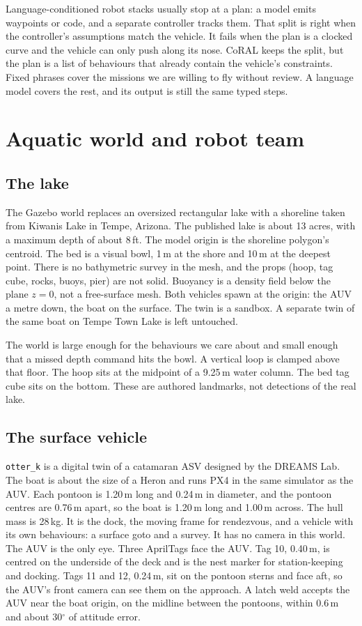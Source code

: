 \documentclass[conference]{IEEEtran}
\def\CoRAL{CoRAL}
\def\otterk{\texttt{otter\_k}}
\begin{document}
Language-conditioned robot stacks usually stop at a plan: a model emits waypoints or code, and a separate controller tracks them. That split is right when the controller's assumptions match the vehicle. It fails when the plan is a clocked curve and the vehicle can only push along its nose. \CoRAL{} keeps the split, but the plan is a list of behaviours that already contain the vehicle's constraints. Fixed phrases cover the missions we are willing to fly without review. A language model covers the rest, and its output is still the same typed steps.

\section{Aquatic world and robot team}
\label{sec:world}

\subsection{The lake}
The Gazebo world replaces an oversized rectangular lake with a shoreline taken from Kiwanis Lake in Tempe, Arizona. The published lake is about 13 acres, with a maximum depth of about 8\,ft. The model origin is the shoreline polygon's centroid. The bed is a visual bowl, 1\,m at the shore and 10\,m at the deepest point. There is no bathymetric survey in the mesh, and the props (hoop, tag cube, rocks, buoys, pier) are not solid. Buoyancy is a density field below the plane $z=0$, not a free-surface mesh. Both vehicles spawn at the origin: the AUV a metre down, the boat on the surface. The twin is a sandbox. A separate twin of the same boat on Tempe Town Lake is left untouched.

The world is large enough for the behaviours we care about and small enough that a missed depth command hits the bowl. A vertical loop is clamped above that floor. The hoop sits at the midpoint of a 9.25\,m water column. The bed tag cube sits on the bottom. These are authored landmarks, not detections of the real lake.

\subsection{The surface vehicle}
\otterk{} is a digital twin of a catamaran ASV designed by the DREAMS Lab. The boat is about the size of a Heron and runs PX4 in the same simulator as the AUV. Each pontoon is 1.20\,m long and 0.24\,m in diameter, and the pontoon centres are 0.76\,m apart, so the boat is 1.20\,m long and 1.00\,m across. The hull mass is 28\,kg. It is the dock, the moving frame for rendezvous, and a vehicle with its own behaviours: a surface goto and a survey. It has no camera in this world. The AUV is the only eye. Three AprilTags face the AUV. Tag 10, 0.40\,m, is centred on the underside of the deck and is the nest marker for station-keeping and docking. Tags 11 and 12, 0.24\,m, sit on the pontoon sterns and face aft, so the AUV's front camera can see them on the approach. A latch weld accepts the AUV near the boat origin, on the midline between the pontoons, within 0.6\,m and about 30$^\circ$ of attitude error.
\end{document}
